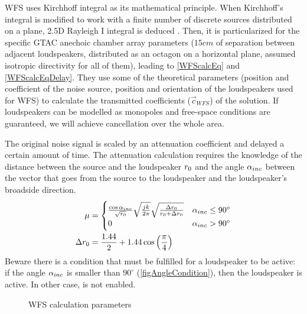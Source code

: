 WFS uses Kirchhoff integral as its mathematical principle. When Kirchhoff's integral is modified to work with a finite number of discrete sources distributed on a plane, 2.5D Rayleigh I integral is deduced \cite{Start1997}. Then, it is particularized for the specific GTAC anechoic chamber array parameters ($15 \si{cm}$ of separation between adjacent loudspeakers, distributed as an octagon on a horizontal plane, assumed isotropic directivity for all of them), leading to \autoref{WFScalcEq} and \autoref{WFScalcEqDelay}. They use some of the theoretical parameters (position and coefficient of the noise source, position and orientation of the loudspeakers used for WFS) to calculate the transmitted coefficients ($\vec{c}_\mathit{WFS}$) of the solution. If loudspeakers can be modelled as monopoles and free-space conditions are guaranteed, we will achieve cancellation over the whole area. 

The original noise signal is scaled by an attenuation coefficient and delayed a certain amount of time. The attenuation calculation requires the knowledge of the distance between the source and the loudspeaker $r_0$ and the angle $\alpha_{inc}$ between the vector that goes from the source to the loudspeaker and the loudspeaker's broadside direction.
\begin{equation}
	\begin{aligned}
		\mu &= 
		\begin{cases}
		\frac{\cos\alpha_{inc}}{\sqrt{r_0}} \sqrt{\frac{jk}{2\pi}} \sqrt{\frac{\Delta r_0}{r_0 + \Delta r_0}} & \alpha_{inc} \leq 90^\circ \\
		0 & \alpha_{inc} > 90^\circ
		\end{cases}
		\\
		\Delta r_0 &= \frac{1.44}{2} + 1.44 \cos\left( \frac{\pi}{4} \right)
	\end{aligned}
	\label{WFScalcEq}
\end{equation}
Beware there is a condition that must be fulfilled for a loudspeaker to be active: if the angle $\alpha_{inc}$ is smaller than $90^\circ$ (\autoref{figAngleCondition}), then the loudspeaker is active. In other case, is not enabled.

%	
\begin{figure}
	\centering
	\def\svgwidth{0.4\columnwidth}
	\graphicspath{{Img/}}
	
	\caption[WFS calculation parameters]{WFS calculation parameters}
	\label{figAngleCondition}
\end{figure}

